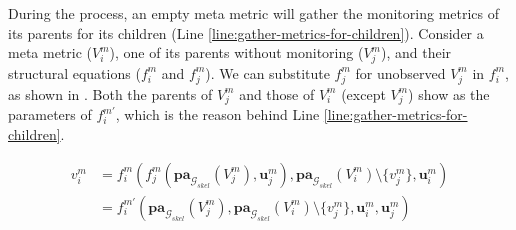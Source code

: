During the process, an empty meta metric will gather the monitoring metrics of its parents for its children (Line \ref{line:gather-metrics-for-children}).
Consider a meta metric ($V_{i}^{m}$), one of its parents without monitoring ($V_{j}^{m}$), and their structural equations ($f_{i}^{m}$ and $f_{j}^{m}$).
We can substitute $f_{j}^{m}$ for unobserved $V_{j}^{m}$ in $f_{i}^{m}$, as shown in .
Both the parents of $V_{j}^{m}$ and those of $V_{i}^{m}$ (except $V_{j}^{m}$) show as the parameters of $f_{i}^{m \prime}$, which is the reason behind Line \ref{line:gather-metrics-for-children}.

\begin{equation}\label{eqn:scm-substitute-variable}
	\begin{aligned}
		v_{i}^{m} & = f_{i}^{m}\left(
		f_{j}^{m}\left(\mathbf{pa}_{\mathcal{G}_{skel}}(V_{j}^{m}), \mathbf{u}_{j}^{m}\right),
		\mathbf{pa}_{\mathcal{G}_{skel}}(V_{i}^{m}) \setminus \{v_{j}^{m}\}, \mathbf{u}_{i}^{m}
		\right) \\
		& = f_{i}^{m \prime}\left(
		\mathbf{pa}_{\mathcal{G}_{skel}}(V_{j}^{m}),
		\mathbf{pa}_{\mathcal{G}_{skel}}(V_{i}^{m}) \setminus \{v_{j}^{m}\},
		\mathbf{u}_{i}^{m}, \mathbf{u}_{j}^{m}
		\right)
	\end{aligned}
\end{equation}

